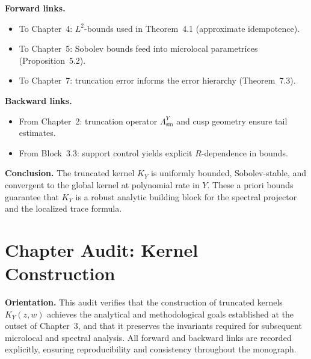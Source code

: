 \medskip

\noindent\textbf{Forward links.}
\begin{itemize}
  \item To Chapter~4: $L^{2}$-bounds used in Theorem~4.1 (approximate idempotence). 
  \item To Chapter~5: Sobolev bounds feed into microlocal parametrices (Proposition~5.2). 
  \item To Chapter~7: truncation error informs the error hierarchy (Theorem~7.3). 
\end{itemize}

\medskip

\noindent\textbf{Backward links.}
\begin{itemize}
  \item From Chapter~2: truncation operator $\Lambda^{Y}_{\mathrm{sm}}$ and cusp geometry ensure tail estimates. 
  \item From Block~3.3: support control yields explicit $R$-dependence in bounds. 
\end{itemize}

\medskip

\noindent\textbf{Conclusion.}
The truncated kernel $K_{Y}$ is uniformly bounded, Sobolev-stable,
and convergent to the global kernel at polynomial rate in $Y$.
These a priori bounds guarantee that $K_{Y}$ is a robust analytic building block
for the spectral projector and the localized trace formula.



\section*{Chapter Audit: Kernel Construction}\label{audit:ch3}

\noindent
\textbf{Orientation.}
This audit verifies that the construction of truncated kernels $K_{Y}(z,w)$
achieves the analytical and methodological goals established at the outset of Chapter~3,
and that it preserves the invariants required for subsequent microlocal and spectral analysis.
All forward and backward links are recorded explicitly,
ensuring reproducibility and consistency throughout the monograph.


